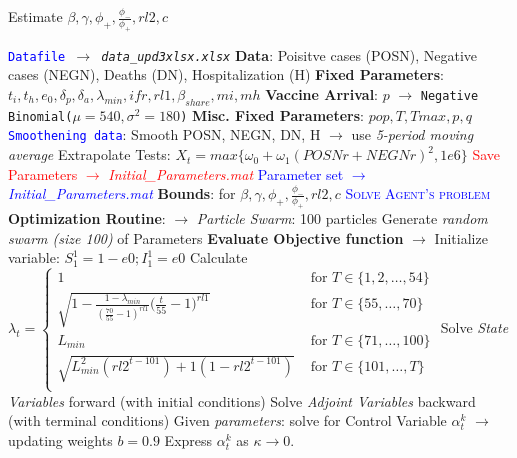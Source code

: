 \documentclass{../cls/NotesV2_Class}
\begin{document}
\begin{algorithm}
	\caption{Estimate $\beta, \gamma, \phi_+, \frac{\phi_-}{\phi_+}, rl2, c$}
	\begin{algorithmic}
		\REQUIRE \texttt{\textcolor{blue}{Datafile} $\rightarrow$ \textit{data\_upd3xlsx.xlsx}}
		\STATE \textbf{Data}: Poisitve cases (POSN), Negative cases (NEGN), Deaths (DN), Hospitalization (H)
		\STATE \textbf{Fixed Parameters}: $t_i, t_h, e_0, \delta_p, \delta_a, \lambda_{min}, ifr, rl1, \beta_{share}, mi, mh$
		\STATE \textbf{Vaccine Arrival}: $p$ $\rightarrow$ \texttt{Negative Binomial($\mu=540, \sigma^2=180$)}
		\STATE \textbf{Misc. Fixed Parameters}: $pop, T, Tmax, p, q$
		\STATE
		\REQUIRE \texttt{\textcolor{blue}{Smoothening data}}:
		\STATE Smooth POSN, NEGN, DN, H $\rightarrow$ use \textit{5-period moving average}
		\STATE Extrapolate Tests: $X_t = max\{\omega_0+ \omega_1(POSNr+NEGNr)^2, 1e6\}$
		\ENSURE \textcolor{red}{Save Parameters $\rightarrow$ \textit{Initial\_Parameters.mat}}
		\STATE
		\STATE
		\REQUIRE \textcolor{blue}{Parameter set $\rightarrow$ \textit{Initial\_Parameters.mat}}
		\STATE \textbf{Bounds}: for $\beta, \gamma, \phi_+, \frac{\phi_-}{\phi_+}, rl2, c$
		\STATE \textcolor{blue}{\textsc{Solve Agent's problem}}
		\STATE \textbf{Optimization Routine}: $\rightarrow$ \textit{Particle Swarm}: 100 particles
			\STATE Generate \textit{random swarm (size 100)} of Parameters
			\STATE \textbf{Evaluate Objective function} $\rightarrow$
			\STATE Initialize variable: $S^1_1=1-e0; I^1_1=e0$
			\STATE Calculate $\lambda_t=\begin{cases}
			1 & \text{ for } T\in\{1,2,\ldots, 54\}\\
			\sqrt{1-\frac{1-\lambda_{min}}{(\frac{70}{55}-1)^{rl1}}\big(\frac{t}{55}-1\big)^{rl1}} & \text{ for } T\in\{55,\ldots,70\} \\
			L_{min}  & \text{ for } T\in\{71,\ldots,100\} \\
			\sqrt{L_{min}^2(rl2^{t-101})+1(1-rl2^{t-101})} & \text{ for } T\in\{101,\ldots, T\}\\
			\end{cases}$
			\STATE Solve \textit{State Variables} forward (with initial conditions)
			\STATE Solve \textit{Adjoint Variables} backward (with terminal conditions)
				\STATE Given \textit{parameters}: solve for Control Variable $\alpha^k_t$ $\rightarrow$ updating weights $b=0.9$
				\STATE Express $\alpha^k_t$ as $\kappa\rightarrow 0$.
			\ENDWHILE

\end{algorithmic}
\end{algorithm}
\end{document}
